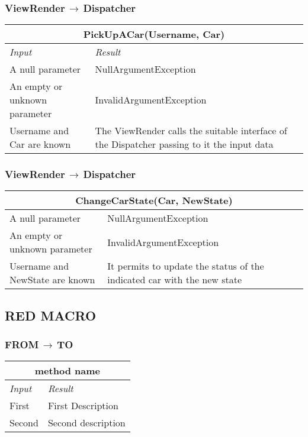 \documentclass[11pt,a4paper]{report}
\begin{document}
\subsubsection{ViewRender$\,\to\,$Dispatcher}
\begin{tabularx}{\textwidth}{|X|X|}
	\hline
	\multicolumn{2}{|c|}{\textbf{PickUpACar(Username, Car)}}\\
	\hline
	\textit{Input} & \textit{Result}\\
	\hline
	A null parameter & NullArgumentException\\
	\hline
	An empty or unknown parameter & InvalidArgumentException\\
	\hline
	Username and Car are known &  The ViewRender calls the suitable interface of the Dispatcher passing to it the input data\\
	\hline
\end{tabularx}
\subsubsection{ViewRender$\,\to\,$Dispatcher}
\begin{tabularx}{\textwidth}{|X|X|}
	\hline
	\multicolumn{2}{|c|}{\textbf{ChangeCarState(Car, NewState)}}\\
	\hline
	A null parameter & NullArgumentException\\
	\hline
	An empty or unknown parameter & InvalidArgumentException\\
	\hline
	Username and NewState are known & It permits to update the status of the indicated car with the new state\\
	\hline
\end{tabularx}
\subsection{RED MACRO}
\subsubsection{FROM$\,\to\,$TO}
\begin{tabularx}{\textwidth}{|X|X|}
	\hline
	\multicolumn{2}{|c|}{\textbf{method name}}\\
	\hline
	\textit{Input} & \textit{Result}\\
	\hline
	First & First Description\\
	\hline
	Second & Second description\\
	\hline
\end{tabularx}
\end{document}

